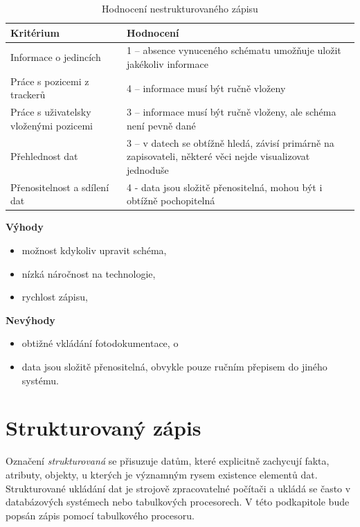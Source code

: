 \begin{table}[h]
	\begin{tabularx}{\textwidth}{ | X | X | }
		\hline
		Kritérium                              & Hodnocení \\
 		\hline			
		Informace o jedincích                  & 1 -- absence vynuceného schématu umožňuje uložit jakékoliv informace          \\
		\hline
		Práce s pozicemi z trackerů            & 4 -- informace musí být ručně vloženy          \\
		\hline
		Práce s uživatelsky vloženými pozicemi & 3 -- informace musí být ručně vloženy, ale schéma není pevně dané          \\
		\hline
		Přehlednost dat                        & 3 -- v datech se obtížně hledá, závisí primárně na zapisovateli, některé věci nejde visualizovat jednoduše          \\
		\hline
		Přenositelnost a sdílení dat           & 4 - data jsou složitě přenositelná, mohou být i obtížně pochopitelná          \\
		\hline	
	\end{tabularx}
	\caption{Hodnocení nestrukturovaného zápisu}
\end{table}

\textbf{Výhody}

\begin{itemize}
	\item možnost kdykoliv upravit schéma,
	\item nízká náročnost na technologie,
	\item rychlost zápisu,
\end{itemize}

\textbf{Nevýhody}

\begin{itemize}
	\item obtižné vkládání fotodokumentace, o
	\item data jsou složitě přenositelná, obvykle pouze ručním přepisem do jiného systému.
\end{itemize}

\section{Strukturovaný zápis}

Označení \emph{strukturovaná} se přisuzuje datům, které explicitně zachycují fakta, atributy, objekty, u kterých je významným rysem existence elementů dat. Strukturované ukládání dat je strojově zpracovatelné počítači a ukládá se často v databázových systémech \cite{sklenák2001data} nebo tabulkových procesorech. V této podkapitole bude popsán zápis pomocí tabulkového procesoru.

